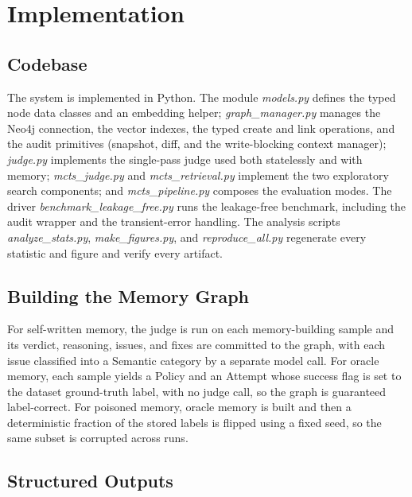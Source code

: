 \documentclass[14pt,a4paper]{extreport}
\begin{document}
\chapter{Implementation}

\section{Codebase}

The system is implemented in Python. The module \emph{models.py} defines the typed node data classes and an embedding helper; \emph{graph\_manager.py} manages the Neo4j connection, the vector indexes, the typed create and link operations, and the audit primitives (snapshot, diff, and the write-blocking context manager); \emph{judge.py} implements the single-pass judge used both statelessly and with memory; \emph{mcts\_judge.py} and \emph{mcts\_retrieval.py} implement the two exploratory search components; and \emph{mcts\_pipeline.py} composes the evaluation modes. The driver \emph{benchmark\_leakage\_free.py} runs the leakage-free benchmark, including the audit wrapper and the transient-error handling. The analysis scripts \emph{analyze\_stats.py}, \emph{make\_figures.py}, and \emph{reproduce\_all.py} regenerate every statistic and figure and verify every artifact.

\section{Building the Memory Graph}

For self-written memory, the judge is run on each memory-building sample and its verdict, reasoning, issues, and fixes are committed to the graph, with each issue classified into a Semantic category by a separate model call. For oracle memory, each sample yields a Policy and an Attempt whose success flag is set to the dataset ground-truth label, with no judge call, so the graph is guaranteed label-correct. For poisoned memory, oracle memory is built and then a deterministic fraction of the stored labels is flipped using a fixed seed, so the same subset is corrupted across runs.

\section{Structured Outputs}
\end{document}
